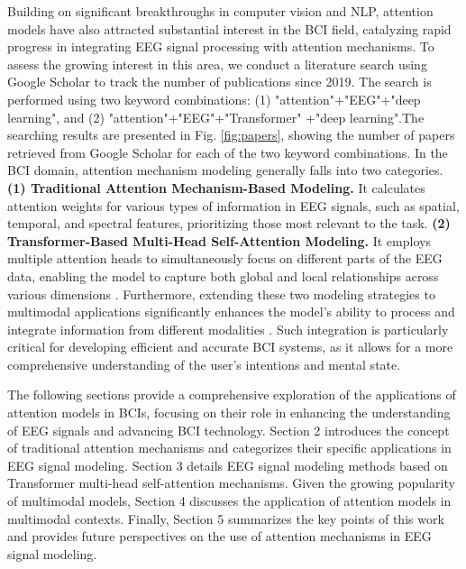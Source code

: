 \documentclass[preprint,12pt]{elsarticle}
\begin{document}
Building on significant breakthroughs in computer vision and NLP, attention models have also attracted substantial interest in the BCI field, catalyzing rapid progress in integrating EEG signal processing with attention mechanisms. To assess the growing interest in this area, we conduct a literature search using Google Scholar to track the number of publications since 2019. The search is performed using two keyword combinations: (1) "attention"+"EEG"+"deep learning", and (2) "attention"+"EEG"+"Transformer"
+"deep learning".The searching results are presented in Fig. \ref{fig:papers}, showing the number of papers retrieved from Google Scholar for each of the two keyword combinations. In the BCI domain, attention mechanism modeling generally falls into two categories.  \textbf{(1) Traditional Attention Mechanism-Based Modeling.} It calculates attention weights for various types of information in EEG signals, such as spatial, temporal, and spectral features, prioritizing those most relevant to the task. \textbf{(2) Transformer-Based Multi-Head Self-Attention Modeling.} It employs multiple attention heads to simultaneously focus on different parts of the EEG data, enabling the model to capture both global and local relationships across various dimensions \cite{chen2022exploring}. Furthermore, extending these two modeling strategies to multimodal applications significantly enhances the model's ability to process and integrate information from different modalities \cite{vortmann2022multimodal}. Such integration is particularly critical for developing efficient and accurate BCI systems, as it allows for a more comprehensive understanding of the user's intentions and mental state.

The following sections provide a comprehensive exploration of the applications of attention models in BCIs, focusing on their role in enhancing the understanding of EEG signals and advancing BCI technology. Section 2 introduces the concept of traditional attention mechanisms and categorizes their specific applications in EEG signal modeling. Section 3 details EEG signal modeling methods based on Transformer multi-head self-attention mechanisms. Given the growing popularity of multimodal models, Section 4 discusses the application of attention models in multimodal contexts. Finally, Section 5 summarizes the key points of this work and provides future perspectives on the use of attention mechanisms in EEG signal modeling.
\end{document}
